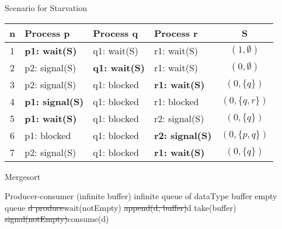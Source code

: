 \begin{wideslide}[bm=,toc=]{\large Scenario for Starvation}
\begin{center}\label{p.sem-starve}
\begin{paenv}
\begin{tabular}{|c|l|l|l|c|}\hline
n&Process  p & Process  q & Process  r &  S \\\hline
1& \bfseries p1: wait(S)  &  q1: wait(S) &  r1: wait(S) &
$(1,\emptyset)$ \\\hline
2& p2: signal(S)  &  \bfseries q1: wait(S) &  r1: wait(S) &
$(0,\emptyset)$ \\\hline
3& p2: signal(S)  &  q1: blocked &  \bfseries r1: wait(S) &
$(0,\{q\})$ \\\hline
4& \bfseries p1: signal(S)  &  q1: blocked &  r1: blocked &
$(0,\{q,r\})$ \\\hline
5& \bfseries p1: wait(S)  &  q1: blocked &  r2: signal(S) &
$(0,\{q\})$ \\\hline
6& p1: blocked  &  q1: blocked &  \bfseries r2: signal(S) &
$(0,\{p,q\})$ \\\hline
7& p2: signal(S)  &  q1: blocked &  \bfseries r1: wait(S) &
$(0,\{q\})$ \\\hline
\end{tabular}
\end{paenv}
\end{center}
\end{wideslide}

\begin{wideslide}[bm=,toc=]{\large }
\begin{algthree}{Mergesort}
\hline
{}
\end{algthree}
\end{wideslide}

\begin{wideslide}[bm=,toc=]{\large }
\begin{alg}{Producer-consumer (infinite buffer)}%
{infinite queue of dataType buffer \la{} empty queue}
\hline
{}
\st{\idt{}d \la{} produce}{\idt{}wait(notEmpty)}
\st{\idt{}append(d, buffer)}{\idt{}d \la{} take(buffer)}
\st{\idt{}signal(notEmpty)}{\idt{}consume(d)}
\end{alg}
\end{wideslide}

